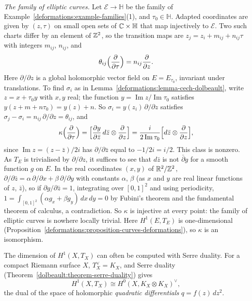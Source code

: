 \begin{example}\label{deformations:example-kodaira-spencer-elliptic}
\emph{The family of elliptic curves.} Let $\mathcal{E} \to \mathbb{H}$ be the family of Example~\ref{deformations:example-families}(1), and $\tau_0 \in \mathbb{H}$. Adapted coordinates are given by $(z, \tau)$ on small open
sets of $\mathbb{C} \times \mathbb{H}$ that map injectively to $\mathcal{E}$. Two such charts differ by an element of $\mathbb{Z}^2$, so the transition maps are $z_j = z_i + m_{ij} + n_{ij}\tau$ with integers $m_{ij}$, $n_{ij}$,
and
\[
\theta_{ij}\Bigl(\frac{\partial}{\partial\tau}\Bigr) = n_{ij}\frac{\partial}{\partial z}.
\]
Here $\partial/\partial z$ is a global holomorphic vector field on $E = E_{\tau_0}$, invariant under translations. To find $\sigma_i$ as in Lemma~\ref{deformations:lemma-cech-dolbeault}, write $z = x + \tau_0y$ with $x, y$ real;
the function $y = \operatorname{Im}z/\operatorname{Im}\tau_0$ satisfies $y(z + m + n\tau_0) = y(z) + n$. So $\sigma_i = y(z_i)\,\partial/\partial z$ satisfies $\sigma_j - \sigma_i = n_{ij}\,\partial/\partial z = \theta_{ij}$, and
\[
\kappa\Bigl(\frac{\partial}{\partial\tau}\Bigr) = \Bigl[\frac{\partial y}{\partial\bar z}\,d\bar z \otimes \frac{\partial}{\partial z}\Bigr] = \frac{i}{2\operatorname{Im}\tau_0}\Bigl[d\bar z \otimes \frac{\partial}{\partial z}\Bigr],
\]
since $\operatorname{Im}z = (z - \bar z)/2i$ has $\partial/\partial\bar z$ equal to $-1/2i = i/2$. This class is nonzero. As $T_E$ is trivialised by $\partial/\partial z$, it suffices to see that $d\bar z$ is not
$\bar\partial g$ for a smooth function $g$ on $E$. In the real coordinates $(x, y)$ of $\mathbb{R}^2/\mathbb{Z}^2$, $\partial/\partial\bar z = \alpha\,\partial/\partial x + \beta\,\partial/\partial y$ with constants $\alpha$, $\beta$ (as $x$ and $y$
are real linear functions of $z$, $\bar z$), so if $\partial g/\partial\bar z = 1$, integrating over $[0, 1]^2$ and using periodicity, $1 = \int_{[0,1]^2}(\alpha g_x + \beta g_y)\,dx\,dy = 0$ by Fubini's theorem and the
fundamental theorem of calculus, a contradiction. So $\kappa$ is injective at every point: the family of elliptic curves is nowhere locally trivial. Here $H^1(E, T_E)$ is one-dimensional
(Proposition~\ref{deformations:proposition-curves-deformations}), so $\kappa$ is an isomorphism.
\end{example}

The dimension of $H^1(X, T_X)$ can often be computed with Serre duality. For a compact Riemann surface $X$, $T_X^\vee = K_X$, and Serre duality (Theorem~\ref{dolbeault:theorem-serre-duality}) gives
\[
H^1(X, T_X) \cong H^0(X, K_X \otimes K_X)^\vee,
\]
the dual of the space of holomorphic \emph{quadratic differentials} $q = f(z)\,dz^2$.

